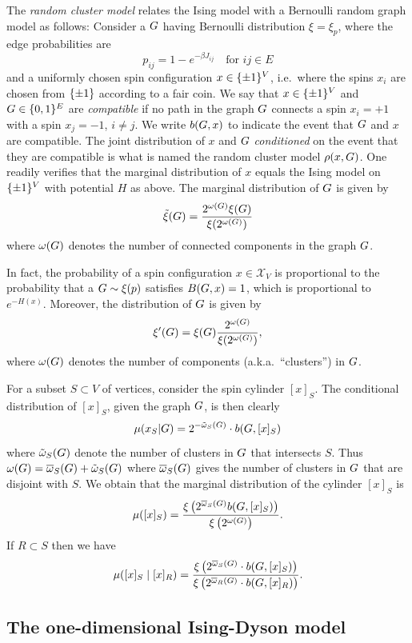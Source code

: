 \documentclass[11pt, a4paper, oneside]{article}
\theoremstyle{definition}
\theoremstyle{remark}
\providecommand{\mscr}{\mathscr}
\providecommand{\ol}{\overline}
\providecommand{\tl}{\tilde}
\def\X{\mscr X}
\begin{document}
The \emph{random cluster model} relates the Ising model with a Bernoulli random
graph model as follows: Consider a $G$ having Bernoulli distribution
$\xi=\xi_p$, where the edge probabilities are
\[ p_{ij} = 1 - e^{-\beta J_{ij}} \quad \text{for $ij\in E$}\] and a uniformly
chosen spin configuration $x\in\{\pm1\}^V$, i.e.\ where the spins $x_i$ are chosen
from $\{\pm1\}$ according to a fair coin. We say that $x\in \{\pm1\}^V$ and $G\in\{0,1\}^E$
are \emph{compatible} if no path in the graph $G$ connects a spin $x_i=+1$ with
a spin $x_j=-1$, $i\not=j$. We write $b(G,x)$ to indicate the event that $G$
and $x$ are compatible. The joint distribution of $x$ and $G$ \emph{conditioned}
on the event that they are compatible is what is named the random cluster model
$\rho(x,G)$. One readily verifies that the marginal distribution of $x$ equals the
Ising model on $\{\pm1\}^V$ with potential $H$ as above. The marginal distribution of
$G$ is given by
\[
  \tl\xi(\t) = \frac{2^{\omega(\t)}\xi(\t)}{\xi(2^{\omega(\t)})}
\]
where $\omega(G)$ denotes the number of connected components in the graph $G$.

In fact, the probability of a spin configuration $x\in\X_V$ is
proportional to the probability that a $G\sim\xi(p)$ satisfies $B(G,x)=1$, which
is proportional to $e^{-H(x)}$. Moreover, the distribution of $G$ is given by
\[
  \xi'( G ) = \xi(G) \frac{2^{\omega(G)}}{\xi(2^{\omega(G)})},
\]
where $\omega(G)$ denotes the number of components (a.k.a.~``clusters'') in $G$.

\def\cy#1{[x]_{#1}}

For a subset $S\subset V$ of vertices, consider the spin cylinder $\cy S$.
The conditional distribution of $\cy S$, given the graph $G$, is then clearly
\[ \mu(x_S|\t) = 2^{-\tl\omega_S(\t)} \cdot b(\t, \cy S)\] 
where $\tl\omega_S(\t)$ denote the number of clusters in $G$ that intersects $S$.
Thus
\(\omega(\t)=\ol\omega_S(\t)+\tl\omega_S(\t)\) where $\ol\omega_S(\t)$ gives the
number of clusters in $G$ that are disjoint with $S$. We obtain that the
marginal distribution of the cylinder $\cy S$ is 
\[\mu(\cy S) = \frac{\XI{ 2^{\ol\omega_S(\t)} b(\t,\cy S)}}{\XI{2^{\omega(\t)}}}. \]
If $R\subset S$ then we have
\[\mu(\cy S\mid \cy R) =
  \frac{\XI{2^{\ol\omega_S(\t)} \cdot b(\t,\cy S)}}
  {\XI{2^{\ol\omega_R(\t)} \cdot b(\t,\cy R)}}. \]

\subsection{The one-dimensional Ising-Dyson model}
\end{document}
